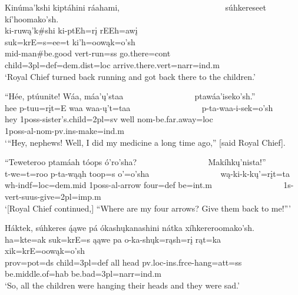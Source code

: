 \begin{exe}
\item\label{EJ55} \glll Kinúma'kshi kiptáhini ráahami, ~ ~ ~ ~ ~ ~ ~ ~ ~ ~ ~ ~ ~ ~ ~ súhkereseet kí'hoomako'sh.\\
ki-ruwą'k\#shi ki-ptEh=rį rEEh=awį ~ ~ ~ ~ ~ ~ ~ ~ ~ ~ ~ ~ ~ ~ ~ suk=krE=s=ee=t ki'h=oowąk=o'sh\\
mid-\textnormal{man}\#\textnormal{be.good} vert-\textnormal{run}=ss \textnormal{go.there}=cont ~ ~ ~ ~ ~ ~ ~ ~ ~ ~ ~ ~ ~ ~ ~ \textnormal{child}=3pl=def=dem.dist=loc \textnormal{arrive.there}.vert=narr=ind.m\\
\glt `Royal Chief turned back running and got back there to the children.'

\item\label{EJ56} \glll ``Hée, ptúunite! Wáa, 
máa'ų'staa ~ ~ ~ ~ ~ ~ ~ ~ ~ ~ ptawáa'iseko'sh.''\\
hee p-tuu=rįt=E waa waa-ų't=taa ~ ~ ~ ~ ~ ~ ~ ~ ~ ~ p-ta-waa-i-sek=o'sh\\
\textnormal{hey} 1poss-\textnormal{sister's.child}=2pl=sv \textnormal{well} nom-\textnormal{be.far.away}=loc ~ ~ ~ ~ ~ ~ ~ ~ ~ ~ 1poss-al-nom-pv.ins-\textnormal{make}=ind.m\\
\glt `{``}Hey, nephews! Well, I did my medicine a long time ago,{''} [said Royal Chief].

\item\label{EJ57} \glll ``Teweteroo ptamáah tóops ó'ro'sha? ~ ~ ~ ~ ~ ~ ~ ~ ~ ~ Makíhkų'nista!''\\
t-we=t=roo p-ta-wąąh toop=s o'=o'sha ~ ~ ~ ~ ~ ~ ~ ~ ~ ~ wą-ki-k-kų'=rįt=ta\\
wh-indf=loc=dem.mid 1poss-al-\textnormal{arrow} \textnormal{four}=def \textnormal{be}=int.m ~ ~ ~ ~ ~ ~ ~ ~ ~ ~ 1s-vert-suus-\textnormal{give}=2pl=imp.m\\
\glt `[Royal Chief continued,] {``}Where are my four arrows? Give them back to me!{''}'

\largerpage
\item\label{EJ58} \glll Háktek, súhkeres ą́ąwe pá ókashųkanashini nátka xíhkereroomako'sh.\\
ha=kte=ak suk=krE=s ąąwe pa o-ka-shųk=rąsh=rį rąt=ka xik=krE=oowąk=o'sh\\
prov=pot=ds \textnormal{child}=3pl=def \textnormal{all} \textnormal{head} pv.loc-ins.frce-\textnormal{hang}=att=ss \textnormal{be.middle.of}=hab \textnormal{be.bad}=3pl=narr=ind.m\\
\glt `So, all the children were hanging their heads and they were sad.'


\end{exe}
